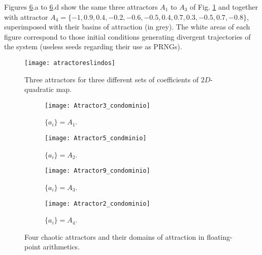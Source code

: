 Figures \ref{fig:atractores3592}.a to \ref{fig:atractores3592}.d show the same three attractors $A_1$ to $A_3$ of Fig. \ref{fig:atractores} and together with attractor $A_4=\{-1,0.9,0.4,-0.2,-0.6,-0.5,0.4,0.7,0.3,-0.5,0.7,-0.8\}$, superimposed with their basins of attraction (in grey).  The white areas of each figure correspond to those initial conditions generating divergent trajectories of the system (useless seeds regarding their use as PRNGs).

\begin{figure}
    \centering
     \texttt{[image: atractoreslindos]}\\
    \caption{Three attractors for three different sets of  coefficients of $2D$-quadratic map.}\label{fig:atractores}
\end{figure}

\begin{figure}
    \centering
    \begin{subfigure}[b]{0.49\textwidth}
        \texttt{[image: Atractor3\_condominio]}
        \caption{$\{a_i\}=A_1$.}
        \label{fig:gull}
    \end{subfigure}
    \hfill 
    \begin{subfigure}[b]{0.49\textwidth}
        \texttt{[image: Atractor5\_condminio]}
        \caption{$\{a_i\}=A_2$.}
        \label{fig:tiger}
    \end{subfigure}
   \hfill 
    \begin{subfigure}[b]{0.49\textwidth}
        \texttt{[image: Atractor9\_condominio]}
        \caption{$\{a_i\}=A_3$.}
        \label{fig:mouse}
    \end{subfigure}
  \hfill  
    \begin{subfigure}[b]{0.49\textwidth}
        \texttt{[image: Atractor2\_condominio]}
        \caption{$\{a_i\}=A_4$.}
        \label{fig:mouse}
    \end{subfigure}
    \caption{Four chaotic attractors and their domains of attraction in floating-point arithmetics.}\label{fig:atractores3592}
\end{figure}